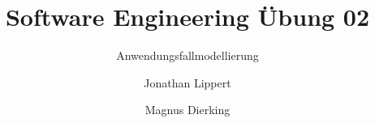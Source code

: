 \documentclass[
	ngerman,
	twoside,
	pdfa=false,
	ruledheaders=section,%
	class=report,%
	thesis={type=Übung},%
	accentcolor=TUDa-9d,%
	custommargins=false,%
	marginpar=false,%
	parskip=half-,%
	fontsize=11pt,%
]{tudapub}
\begin{document}
	\title{Software Engineering Übung 02}
	\subtitle{Anwendungsfallmodellierung}
	\author[J.Lippert \and M. Dierking]
	{Jonathan Lippert \and Magnus Dierking}

	
	

	\maketitle


%	

	\newpage
	\setcounter{page}{1}

     
     
	

	\printbibliography %
	
%	
	
\end{document}
